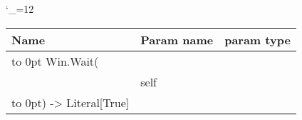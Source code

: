 \begingroup \catcode`\_=12 \tt
\begin{tabular}{lll}
\toprule
\textrm{Name}&\textrm{Param name}&\textrm{param type}\\
\midrule
\hbox to 0pt {Win.Wait(\hss}\\
& self\\
\hbox to 0pt{) -> Literal[True]\hss}\\
\bottomrule
\end{tabular}
\endgroup
